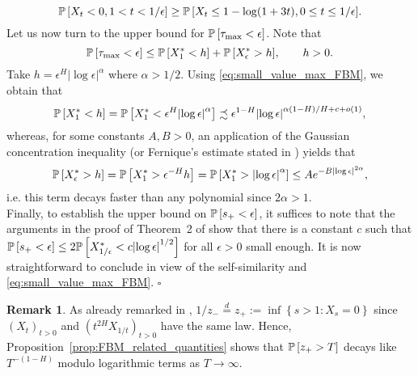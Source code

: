 \documentclass[11pt]{article}
\theoremstyle{plain}
\theoremstyle{definition}
\newtheorem{remark}[thm]{Remark}
\renewenvironment{proof}[1][] {\smallskip \noindent {\bf Proof#1.} }{\hspace*{\fill}$\square$\medskip\par}
\begin{document}
\begin{proof}
\[
   {{{\bf {\mathbb{P}}}}\left[{X_t < 0, 1 < t < 1/\epsilon}\right]} \ge {{{\bf {\mathbb{P}}}}\left[{X_t \le 1 - \log(1+ 3 t), 0 \le t \le 1/\epsilon}\right]}. 
\]
Let us now turn to the upper bound for ${{{\bf {\mathbb{P}}}}\left[{\tau_{\max} < \epsilon}\right]}$. Note that
\[
   {{{\bf {\mathbb{P}}}}\left[{\tau_{\max} < \epsilon}\right]} \le {{{\bf {\mathbb{P}}}}\left[{X_1^* < h}\right]} + {{{\bf {\mathbb{P}}}}\left[{X_\epsilon^* > h}\right]}, \qquad h > 0.
\]
Take $h = \epsilon^H {\lvert{\log \epsilon}\rvert}^{\alpha}$ where $\alpha > 1/2$. Using \eqref{eq:small_value_max_FBM}, we obtain that
\[
   {{{\bf {\mathbb{P}}}}\left[{X_1^* < h}\right]} = {{{\bf {\mathbb{P}}}}\left[{X_1^* < \epsilon^H {\lvert{\log \epsilon}\rvert}^{\alpha} }\right]} \precsim \epsilon^{1-H} {\lvert{\log \epsilon}\rvert}^{\alpha(1 - H)/H + c + o(1)},
\]
whereas, for some constants $A,B > 0$, an application of the Gaussian concentration inequality (or Fernique's estimate stated in \cite{molchan:1999a}) yields that
\[
   {{{\bf {\mathbb{P}}}}\left[{X^*_\epsilon > h}\right]} = {{{\bf {\mathbb{P}}}}\left[{X_1^* > \epsilon^{-H} h}\right]} = {{{\bf {\mathbb{P}}}}\left[{X_1^* > {\lvert{\log \epsilon}\rvert}^{\alpha}}\right]} \le A e^{-B {\lvert{\log \epsilon}\rvert}^{2\alpha}},
\]
i.e. this term decays faster than any polynomial since $2\alpha > 1$. \\
Finally, to establish the upper bound on ${{{\bf {\mathbb{P}}}}\left[{s_+ < \epsilon}\right]}$, it suffices to note that the arguments in the proof of Theorem~2 of \cite{molchan:1999a} show that there is a constant $c$ such that ${{{\bf {\mathbb{P}}}}\left[{s_+ < \epsilon}\right]} \le 2 {{{\bf {\mathbb{P}}}}\left[{X_{1/\epsilon}^* < c {\lvert{\log \epsilon}\rvert}^{1/2}}\right]}$ for all $\epsilon > 0$ small enough. It is now straightforward to conclude in view of the self-similarity and \eqref{eq:small_value_max_FBM}.
\end{proof}
\begin{remark}
   As already remarked in \cite{molchan:1999a}, $1/z_- \stackrel{d}{=} z_+ := \inf {\left\lbrace {s > 1: X_s = 0} \right\rbrace}$ since $(X_t)_{t > 0}$ and $(t^{2H} X_{1/t})_{t > 0}$ have the same law. Hence, Proposition~\ref{prop:FBM_related_quantities} shows that ${{{\bf {\mathbb{P}}}}\left[{z_+ > T}\right]}$ decays like $T^{-(1-H)}$ modulo logarithmic terms as $T \to \infty$.
\end{remark}



\end{document}
